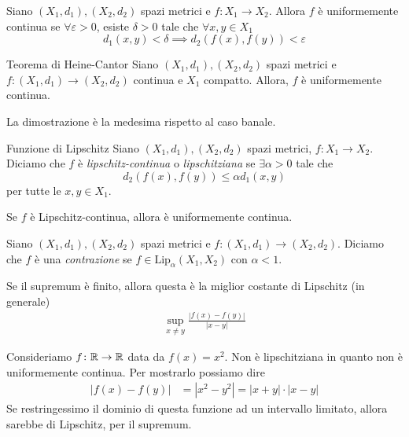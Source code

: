 \documentclass[a4paper]{article}
\begin{document}
\begin{snippetdefinition}{}
    Siano \((X_1, d_1),(X_2, d_2)\) spazi metrici e \(f\colon X_1 \to X_2\).
    Allora \(f\) è uniformemente continua se
    \(\forall \varepsilon > 0\), esiste \(\delta > 0\)
    tale che \(\forall x,y \in X_1\)
    \[
        d_1(x, y) < \delta \implies d_2(f(x), f(y)) < \varepsilon
    \]
\end{snippetdefinition}

\begin{snippettheorem}{Teorema di Heine-Cantor}
    Siano \((X_1, d_1),(X_2, d_2)\) spazi metrici e 
    \(f\colon (X_1, d_1) \to (X_2, d_2)\)
    continua e \(X_1\) compatto.
    Allora, \(f\) è uniformemente continua.
\end{snippettheorem}

La dimostrazione è la medesima rispetto al caso banale.

\begin{snippetdefinition}{Funzione di Lipschitz}
    Siano \((X_1, d_1),(X_2, d_2)\) spazi metrici,
    \(f\colon X_1 \to X_2\).
    Diciamo che \(f\) è \emph{lipschitz-continua} o \emph{lipschitziana}
    se \(\exists \alpha > 0\) tale che
    \[
        d_2(f(x), f(y)) \leq \alpha d_1(x,y)
    \]
    per tutte le \(x,y \in X_1\).
\end{snippetdefinition}

\begin{snippetproposition}{}
    Se \(f\) è Lipschitz-continua, allora è uniformemente continua.
\end{snippetproposition}

\begin{snippetdefinition}{}
    Siano \((X_1, d_1),(X_2, d_2)\) spazi metrici e 
    \(f\colon (X_1, d_1) \to (X_2, d_2)\).
    Diciamo che \(f\) è una \emph{contrazione} se
    \(f \in \text{Lip}_\alpha(X_1, X_2)\) con \(\alpha < 1\).
\end{snippetdefinition}

Se il supremum è finito, allora questa è la miglior costante di Lipschitz (in generale)
\begin{align*}
    \sup_{x\neq y} \frac{|f(x)-f(y)|}{|x-y|}
\end{align*}

\begin{snippetexample}{}
    Consideriamo \(f \colon \mathbb{R} \to \mathbb{R}\)
    data da \(f(x) = x^2\). Non è lipschitziana in quanto non è uniformemente continua.
    Per mostrarlo possiamo dire
    \begin{align*}
        |f(x)-f(y)| &= |x^2 - y^2| = |x+y| \cdot |x-y|
    \end{align*}
    Se restringessimo il dominio di questa funzione ad un intervallo limitato,
    allora sarebbe di Lipschitz, per il supremum.
\end{snippetexample}
\end{document}
